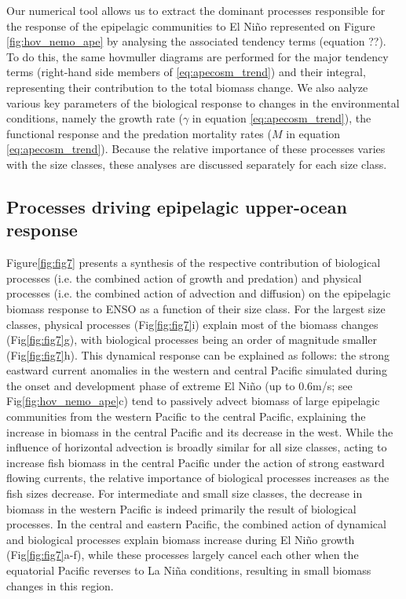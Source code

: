 Our numerical tool allows us to extract the dominant processes responsible for the response of the epipelagic communities to El Niño represented on Figure \ref{fig:hov_nemo_ape} by analysing the associated tendency terms (equation ??). To do this, the same hovmuller diagrams are performed for the major tendency terms (right-hand side members of \ref{eq:apecosm_trend}) and their integral, representing their contribution to the total biomass change. We also aalyze various key parameters of the biological response to changes in the environmental conditions, namely the growth rate ($\gamma$ in equation \ref{eq:apecosm_trend}), the functional response and the predation mortality rates ($M$ in equation \ref{eq:apecosm_trend}). Because the relative importance of these processes varies with the size classes, these analyses are discussed separately for each size class.

\subsection{Processes driving epipelagic upper-ocean response}

Figure\ref{fig:fig7} presents a synthesis of the respective contribution of biological processes (i.e. the combined action of growth and predation) and physical processes (i.e. the combined action of advection and diffusion) on the epipelagic biomass response to ENSO as a function of their size class. For the largest size classes, physical processes (Fig\ref{fig:fig7}i) explain most of the biomass changes (Fig\ref{fig:fig7}g), with biological processes being an order of magnitude smaller (Fig\ref{fig:fig7}h). This dynamical response can be explained as follows: the strong eastward current anomalies in the western and central Pacific simulated during the onset and development phase of extreme El Niño (up to 0.6m/s; see Fig\ref{fig:hov_nemo_ape}c) tend to passively advect biomass of large epipelagic communities from the western Pacific to the central Pacific, explaining the increase in biomass in the central Pacific and its decrease in the west. While the influence of horizontal advection is broadly similar for all size classes, acting to increase fish biomass in the central Pacific under the action of strong eastward flowing currents, the relative importance of biological processes increases as the fish sizes decrease. For intermediate and small size classes, the decrease in biomass in the western Pacific is indeed primarily the result of biological processes. In the central and eastern Pacific, the combined action of dynamical and biological processes explain biomass increase during El Niño growth (Fig\ref{fig:fig7}a-f), while these processes largely cancel each other when the equatorial Pacific reverses to La Niña conditions, resulting in small biomass changes in this region.  



